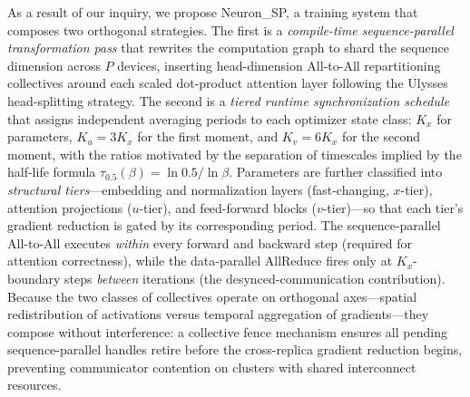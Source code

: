 \documentclass{article}
\begin{document}
As a result of our inquiry, we propose Neuron\_SP, a training system that composes two
orthogonal strategies. The first is a \emph{compile-time sequence-parallel transformation pass}
that rewrites the computation graph to shard the sequence dimension across $P$ devices,
inserting head-dimension All-to-All repartitioning collectives around each scaled dot-product
attention layer following the Ulysses head-splitting strategy. The second is a \emph{tiered
runtime synchronization schedule} that assigns independent averaging periods to each optimizer
state class: $K_x$ for parameters, $K_u = 3K_x$ for the first moment, and $K_v = 6K_x$ for
the second moment, with the ratios motivated by the separation of timescales implied by
the half-life formula $\tau_{0.5}(\beta) = \ln 0.5 / \ln \beta$.
Parameters are further classified into \emph{structural tiers}---embedding and normalization
layers (fast-changing, $x$-tier), attention projections ($u$-tier), and feed-forward blocks
($v$-tier)---so that each tier's gradient reduction is gated by its corresponding period.
The sequence-parallel All-to-All executes \emph{within} every forward and backward step
(required for attention correctness), while the data-parallel AllReduce fires only at
$K_x$-boundary steps \emph{between} iterations (the desynced-communication contribution).
Because the two classes of collectives operate on orthogonal axes---spatial redistribution
of activations versus temporal aggregation of gradients---they compose without interference:
a collective fence mechanism ensures all pending sequence-parallel handles retire before
the cross-replica gradient reduction begins, preventing communicator contention on clusters
with shared interconnect resources.
\end{document}
